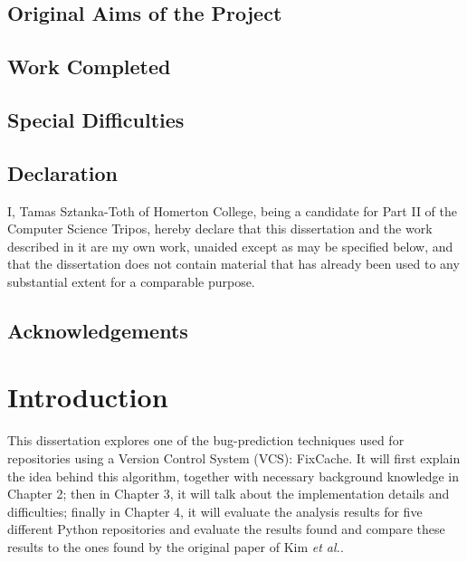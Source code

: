 \documentclass[12pt,twoside,notitlepage]{report}
\newcommand{\fxch}{FixCache}
\newcommand{\etal}{\textit{et al.}}
\begin{document}
\section*{Original Aims of the Project}


\section*{Work Completed}

\section*{Special Difficulties}
 
\newpage
\section*{Declaration}

I, Tamas Sztanka-Toth of Homerton College, being a candidate for Part II of the Computer
Science Tripos, hereby declare
that this dissertation and the work described in it are my own work,
unaided except as may be specified below, and that the dissertation
does not contain material that has already been used to any substantial
extent for a comparable purpose.

\bigskip
{}

\medskip
{}

\cleardoublepage

\tableofcontents

\listoffigures

\newpage
\section*{Acknowledgements}



\cleardoublepage        %
\setcounter{page}{1}
\pagestyle{headings}
\chapter{Introduction}
This dissertation explores one of the bug-prediction techniques used for repositories using a Version Control System (VCS): \fxch{}\cite{FixCache}. It will first explain the idea behind this algorithm, together with necessary background knowledge in Chapter 2; then in Chapter 3, it will talk about the implementation details and difficulties; finally in Chapter 4, it will evaluate the analysis results for five different Python repositories and evaluate the results found and compare these results to the ones found by the original paper of Kim \etal{}\cite{FixCache}.
\end{document}
